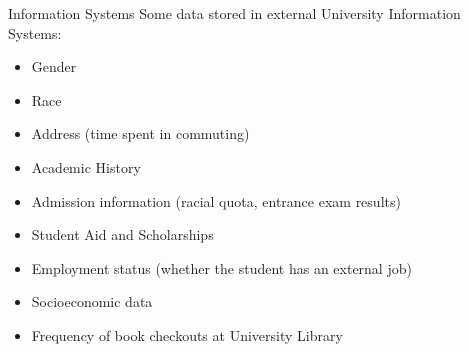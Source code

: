 \begin{frame}{Information Systems}
    Some data stored in external University Information Systems:
    \begin{itemize}[<+-|alert@+>]\color{gray}
        \item Gender
        \item Race
        \item Address (time spent in commuting)
        \item Academic History
        \item Admission information (racial quota, entrance exam results)
        \item Student Aid and Scholarships
        \item Employment status (whether the student has an external job)
        \item Socioeconomic data
        \item Frequency of book checkouts at University Library
    \end{itemize}
\end{frame}

